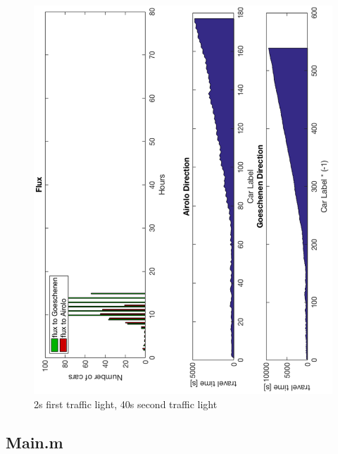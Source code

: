 \documentclass[11pt,a4paper,parskip=half-]{article}
\begin{document}
\begin{figure}[h!]
\includegraphics[scale=0.85]{2_40_3g}
\centering
\vspace*{-4mm}
\caption{2s first traffic light, 40s second traffic light}
\label{fig:2_40_3g}
\end{figure}





\clearpage
\subsection{Main.m}



\end{document}
